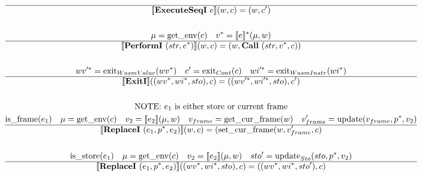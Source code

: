 \begin{gather*}
  \hline
  \sem{\executeseqi ~ e}(w, c) = (w, c') \\
%
\newline \\
  \mu = \getenv(c) \quad
  \seq v = \seq{\sem{e}}(\mu, w) \\
  \hline
  \sem{\performi ~ (str, \seq e)}(w, c) = (w, \call ~ (str, \seq v, c)) \\
%
\newline \\
  \seq{wv'} = \exit_{WasmValue}(\seq{wv}) \quad
  c' = \exit_{Cont}(c) \quad
  \seq{wi'} = \exit_{WasmInstr}(\seq{wi}) \\
  \hline
  \sem{\exiti}((\seq{wv}, \seq{wi}, sto), c)
  =
  ((\seq{wv'}, \seq{wi'}, sto), c') \\
%
\newline \\
\text{NOTE: $e_1$ is either store or current frame} \\
  \isframe(e_1) \quad
  \mu = \getenv(c) \quad
  v_2 = \sem{e_2}(\mu, w) \quad
  v_{frame} = \getcurframe(w) \quad
  v_{frame}' = \update(v_{frame}, \seq p, v_2) \\
  \hline
  \sem{\replacei ~ (e_1, \seq p, e_2)}(w, c)
  = (\setcurframe(w, v_{frame}', c) \\
%
\newline \\
  \isstore(e_1) \quad
  \mu = \getenv(c) \quad
  v_2 = \sem{e_2}(\mu, w) \quad
  sto' = \update_{Sto}(sto, \seq p, v_2) \\
  \hline
  \sem{\replacei ~ (e_1, \seq p, e_2)}((\seq{wv}, \seq{wi}, sto), c)
  = ((\seq{wv}, \seq{wi}, sto'), c) \\
\newline \\
\end{gather*}






